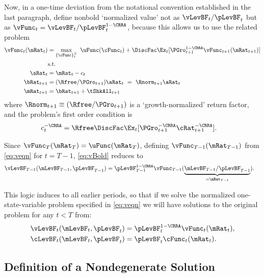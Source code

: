 \documentclass[./BufferStockTheory.tex]{subfiles}
\begin{document}
\hypertarget{The-Related-Problem}{}
Now, in a one-time deviation from the notational convention established in the last paragraph, define nonbold `normalized value' not as $\vLevBF_{t}/\pLevBF_{t}$ but as $\vFunc_{t} = \vLevBF_{t}/\pLevBF_{t}^{1-\CRRA}$, because this allows us to use the related problem 
\begin{align}
\vFunc_{t}(\mRat_{t})  & = \max_{\{\cFunc\}_{t}^{T}}~  \uFunc(\cFunc_{t}) +\DiscFac \Ex_{t}[\PGro_{t+1}^{1-\CRRA}\vFunc_{t+1}({\mRat}_{t+1})] \notag \\
& \mbox{s.t.}  \label{eq:veqn} 
 \\ {\aRat}_{t}  & = \mRat_{t}-c_{t}  \notag
 \\ {\bRat}_{t+1}  & = (\Rfree/\PGro_{t+1})\aRat_{t}  ~ = ~ \Rnorm_{t+1}\aRat_{t}  \notag
\\ \mRat_{t+1}  & = \bRat_{t+1}+\tShkAll_{t+1}  \notag %
\end{align}
where $\Rnorm_{t+1}\equiv (\Rfree/\PGro_{t+1})$ is a `growth-normalized' return factor, and the problem's first order condition is
\begin{align}
c_{t}^{-\CRRA}  & = \Rfree \DiscFac \Ex_{t}[ {\PGro}_{t+1}^{-\CRRA} {\cRat}
_{t+1}^{-\CRRA}].  \label{eq:scaledeuler}
\end{align}

Since $\vFunc_{T}(\mRat_{T}) = \uFunc(\mRat_{T})$, defining $\vFunc_{T-1}(\mRat_{T-1})$ from \eqref{eq:veqn} for $t=T-1$, \eqref{eq:vBold} reduces to
\begin{align*}
\vLevBF_{T-1}(\mLevBF_{T-1},\pLevBF_{T-1})  & = \pLevBF_{T-1}^{1-\CRRA} \vFunc_{T-1}(\underbrace{\mLevBF_{T-1}/\pLevBF_{T-1}}_{=\mRat_{T-1}}).
\end{align*}

This logic induces to all earlier periods, so that if we solve the
normalized one-state-variable problem specified in \eqref{eq:veqn} we
will have solutions to the original problem for any $t<T$
from:
\begin{align*}
   \vLevBF_{t}(\mLevBF_{t},\pLevBF_{t})  & = \pLevBF_{t}^{1-\CRRA}\vFunc_{t}(\mRat_{t}),
\\ \cLevBF_{t}(\mLevBF_{t},\pLevBF_{t})  & = \pLevBF_{t}\cFunc_{t}(\mRat_{t}).
\end{align*}

\hypertarget{Definition-of-a-Nondegenerate-Solution}{}
\subsection{Definition of a Nondegenerate Solution}
\end{document}
